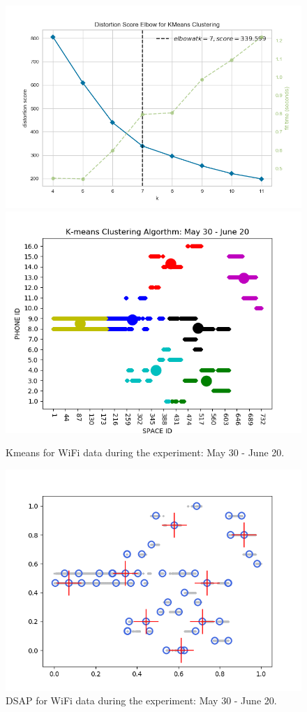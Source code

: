 \documentclass[../UNBThesis2.tex]{subfiles}
\begin{document}
\begin{figure}[!h]
    \centering
    \includegraphics[width = 7.5 cm]{image/Chapters/Chapter6/elbowWholeWifiNormalize.png}\hfill
     \includegraphics[width = 7.5 cm]{image/Chapters/Chapter6/kmeanswifiAllDays.png}
    \\[\smallskipamount]    
    \caption{Kmeans for WiFi data during the experiment: May 30 - June 20.}
    \label{2}
\end{figure}






\begin{figure}[!h]
    \centering
    \includegraphics[width = 10 cm]{image/Chapters/Chapter6/DSAPalldays.png}
    \caption{ DSAP for WiFi data during the experiment: May 30 - June 20.}
    \label{1}
\end{figure}
\end{document}
